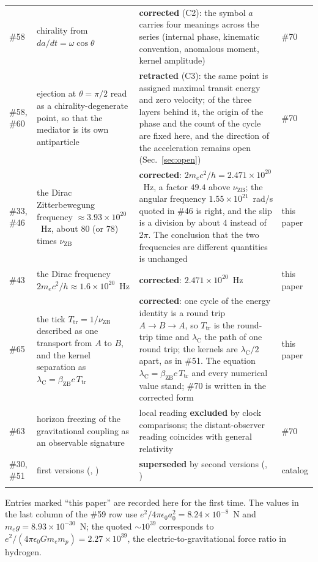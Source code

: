 \documentclass[%
 reprint, amsmath,amssymb, aps, prb, ]{revtex4-2}
\numberwithin{equation}{section}
\newcommand{\betaZB}{\beta_{\text{ZB}}}
\newcommand{\lambdaC}{\lambda_{\text{C}}}
\newcommand{\nuZB}{\nu_{\text{ZB}}}
\newcommand{\Ttr}{T_{\text{tr}}}
\newcommand{\zrec}[1]{\href{https://doi.org/10.5281/zenodo.#1}{\texttt{\detokenize{#1}}}}
\begin{document}
\begin{table}[p]
\begin{tabular}{>{\raggedright\arraybackslash}p{1.5cm}>{\raggedright\arraybackslash}p{5.5cm}>{\raggedright\arraybackslash}p{7.3cm}>{\raggedright\arraybackslash}p{1.8cm}}
\addlinespace[0.12cm]
\#58 & chirality from $da/dt = \omega\cos\theta$ & \textbf{corrected} (C2): the symbol $a$ carries four meanings across the series (internal phase, kinematic convention, anomalous moment, kernel amplitude) & \#70 \\
\addlinespace[0.12cm]
\#58, \#60 & ejection at $\theta=\pi/2$ read as a chirality-degenerate point, so that the mediator is its own antiparticle & \textbf{retracted} (C3): the same point is assigned maximal transit energy and zero velocity; of the three layers behind it, the origin of the phase and the count of the cycle are fixed here, and the direction of the acceleration remains open (Sec.~\ref{sec:open}) & \#70 \\
\addlinespace[0.12cm]
\#33, \#46 & the Dirac Zitterbewegung frequency $\approx3.93\times10^{20}$~Hz, about $80$ (or $78$) times $\nuZB$ & \textbf{corrected}: $2m_ec^{2}/h = 2.471\times10^{20}$~Hz, a factor $49.4$ above $\nuZB$; the angular frequency $1.55\times10^{21}$~rad/s quoted in \#46 is right, and the slip is a division by about $4$ instead of $2\pi$. The conclusion that the two frequencies are different quantities is unchanged & this paper \\
\addlinespace[0.12cm]
\#43 & the Dirac frequency $2m_ec^{2}/h\approx1.6\times10^{20}$~Hz & \textbf{corrected}: $2.471\times10^{20}$~Hz & this paper \\
\addlinespace[0.12cm]
\#65 & the tick $\Ttr = 1/\nuZB$ described as one transport from $A$ to $B$, and the kernel separation as $\lambdaC = \betaZB c\,\Ttr$ & \textbf{corrected}: one cycle of the energy identity is a round trip $A\to B\to A$, so $\Ttr$ is the round-trip time and $\lambdaC$ the path of one round trip; the kernels are $\lambdaC/2$ apart, as in \#51. The equation $\lambdaC = \betaZB c\,\Ttr$ and every numerical value stand; \#70 is written in the corrected form & this paper \\
\addlinespace[0.12cm]
\#63 & horizon freezing of the gravitational coupling as an observable signature & local reading \textbf{excluded} by clock comparisons; the distant-observer reading coincides with general relativity & \#70 \\
\addlinespace[0.12cm]
\#30, \#51 & first versions (\zrec{18135855}, \zrec{19489126}) & \textbf{superseded} by second versions (\zrec{18819682}, \zrec{20388056}) & catalog \\
\addlinespace[0.08cm]
\bottomrule
\end{tabular}
\vspace{0.2cm}
\begin{minipage}{0.95\textwidth}
\justifying\footnotesize
Entries marked ``this paper'' are recorded here for the first time. The values in the last column of the \#59 row use $e^{2}/4\pi\epsilon_0a_0^{2} = 8.24\times10^{-8}$~N and $m_eg = 8.93\times10^{-30}$~N; the quoted $\sim10^{39}$ corresponds to $e^{2}/(4\pi\epsilon_0 Gm_em_p) = 2.27\times10^{39}$, the electric-to-gravitational force ratio in hydrogen.
\end{minipage}
\end{table}
\end{document}
